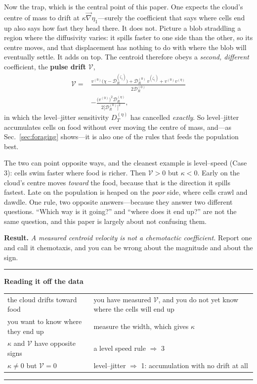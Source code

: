 \documentclass[
  reprint,
  superscriptaddress,
  amsmath,
  amssymb,
  aps,
  pre,
  nofootinbib,
  floatfix
]{revtex4-2}
\makeatletter
\newcommand{\grad}{\vec{\nabla}}
\newcommand{\DR}{\mathcal D_R^{(0)}}
\newcommand{\zp}{\zeta_\parallel}
\newenvironment{readout}
  {\par\addvspace{1.2ex}\noindent\rule{\columnwidth}{0.6pt}\par\nobreak
   \vspace{0.3ex}\noindent\textbf{Reading it off the data}\par\nobreak
   \vspace{0.4ex}\footnotesize\noindent
   \setlength{\parindent}{0pt}%
   \setlength{\emergencystretch}{3em}%
   \let\readout@restore\@arrayparboxrestore
   \def\@arrayparboxrestore{\readout@restore\raggedright\let\\\tabularnewline}%
   \begin{tabular}{@{}p{0.42\columnwidth}@{\hspace{0.9em}}p{0.50\columnwidth}@{}}}
  {\end{tabular}\par\nobreak\vspace{0.4ex}%
   \noindent\rule{\columnwidth}{0.6pt}\par\addvspace{1.0ex}}
\makeatother
\begin{document}
Now the trap, which is the central point of this paper.  One expects the
cloud's centre of mass to drift at $\kappa\grad\eta_1$---surely the
coefficient that says where cells end up also says how fast they head there.
It does not.  Picture a blob straddling a region where the diffusivity varies:
it spills faster to one side than the other, so its centre moves, and that
displacement has nothing to do with where the blob will eventually settle.  It
adds on top.  The centroid therefore obeys a \emph{second, different}
coefficient, the \textbf{pulse drift} $\mathcal V$,
\begin{equation}
\begin{split}
 \mathcal V={}&\frac{v^{(0)}\bigl(\chi-\mathcal D_R^{(\zp)}\bigr)
 +\DR\,v^{(\zp)}+v^{(0)}v^{(\eta)}}{2\DR}\\
 &-\frac{\bigl(v^{(0)}\bigr)^2\mathcal D_R^{(\eta)}}{2\bigl[\DR\bigr]^2},
\end{split}
 \label{eq:pulse-drift}
\end{equation}
in which the level--jitter sensitivity $D_T^{(\eta)}$ has cancelled
\emph{exactly}.  So level--jitter accumulates cells on food without ever
moving the centre of mass, and---as Sec.~\ref{sec:foraging} shows---it is also
one of the rules that feeds the population best.

The two can point opposite ways, and the cleanest example is level--speed
(Case 3): cells swim faster where food is richer.  Then $\mathcal V>0$ but
$\kappa<0$.  Early on the cloud's centre moves \emph{toward} the food, because
that is the direction it spills fastest.  Late on the population is heaped on
the \emph{poor} side, where cells crawl and dawdle.  One rule, two opposite
answers---because they answer two different questions.  ``Which way is it
going?'' and ``where does it end up?'' are not the same question, and this
paper is largely about not confusing them.

\textbf{Result.}  \emph{A measured centroid velocity is not a chemotactic
coefficient.}  Report one and call it chemotaxis, and you can be wrong about
the magnitude and about the sign.

\begin{readout}
the cloud drifts toward food & you have measured $\mathcal V$, and you do not
yet know where the cells will end up\\[2pt]
you want to know where they end up & measure the width, which gives
$\kappa$\\[2pt]
$\kappa$ and $\mathcal V$ have opposite signs & a level speed rule
$\Rightarrow$ 3\\[2pt]
$\kappa\neq0$ but $\mathcal V=0$ & level--jitter $\Rightarrow$ 1: accumulation
with no drift at all\\
\end{readout}
\end{document}
